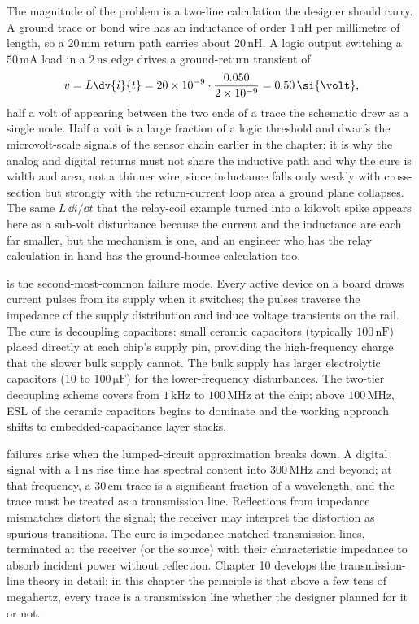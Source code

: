 The magnitude of the problem is a two-line calculation the designer should
carry. A ground trace or bond wire has an inductance of order $1\,\si{\nano
\henry}$ per millimetre of length, so a $20\,\si{\milli\meter}$ return path
carries about $20\,\si{\nano\henry}$. A logic output switching a
$50\,\si{\milli\ampere}$ load in a $2\,\si{\nano\second}$ edge drives a
ground-return transient of
\[
v = L\dv{i}{t} = 20\times 10^{-9}\cdot\frac{0.050}{2\times 10^{-9}}
= 0.50\,\si{\volt},
\]
half a volt of  appearing between the two ends of a
trace the schematic drew as a single node. Half a volt is a large fraction of
a logic threshold and dwarfs the microvolt-scale signals of the sensor chain
earlier in the chapter; it is why the analog and digital returns must not
share the inductive path and why the cure is width and area, not a thinner
wire, since inductance falls only weakly with cross-section but strongly with
the return-current loop area a ground plane collapses. The same $L\,\dd i/\dd
t$ that the relay-coil example turned into a kilovolt spike appears here as a
sub-volt disturbance because the current and the inductance are each far
smaller, but the mechanism is one, and an engineer who has the relay
calculation in hand has the ground-bounce calculation too.

 is the second-most-common failure
mode. Every active device on a board draws current pulses from its
supply when it switches; the pulses traverse the impedance of the
supply distribution and induce voltage transients on the rail. The
cure is decoupling capacitors: small ceramic capacitors (typically
$100\,\si{\nano\farad}$) placed directly at each chip's supply pin,
providing the high-frequency charge that the slower bulk supply
cannot. The bulk supply has larger electrolytic capacitors
($10$ to $100\,\si{\micro\farad}$) for the lower-frequency
disturbances. The two-tier decoupling scheme covers from $1\,\si{
\kilo\hertz}$ to $100\,\si{\mega\hertz}$ at the chip; above $100\,\si{
\mega\hertz}$, ESL of the ceramic capacitors begins to dominate and
the working approach shifts to embedded-capacitance layer stacks.

 failures arise when the lumped-circuit
approximation breaks down. A digital signal with a $1\,\si{\nano
\second}$ rise time has spectral content into $300\,\si{\mega\hertz}$
and beyond; at that frequency, a $30\,\si{\centi\meter}$ trace is a
significant fraction of a wavelength, and the trace must be treated
as a transmission line. Reflections from impedance mismatches distort
the signal; the receiver may interpret the distortion as spurious
transitions. The cure is impedance-matched transmission lines,
terminated at the receiver (or the source) with their characteristic
impedance to absorb incident power without reflection. Chapter 10
develops the transmission-line theory in detail; in this chapter the
principle is that above a few tens of megahertz, every trace is a
transmission line whether the designer planned for it or not.

